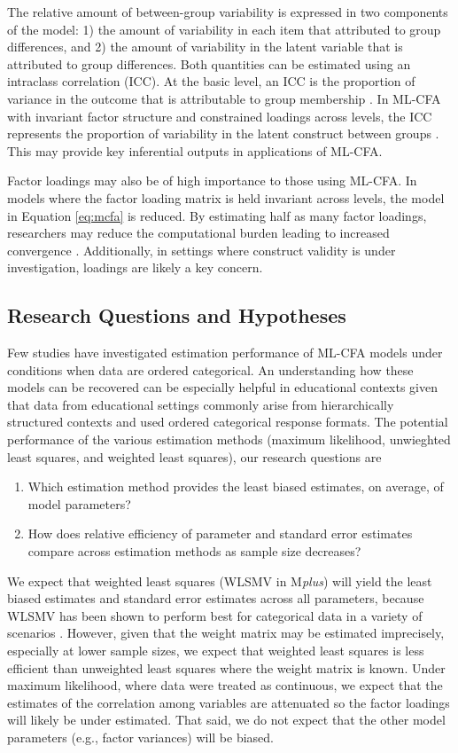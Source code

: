 \documentclass[Review,sageh,times, doublespace]{sagej}
\begin{document}
The relative amount of between-group variability is expressed in two components of the model: 1) the amount of variability in each item that attributed to group differences, and 2) the amount of variability in the latent variable that is attributed to group differences.
Both quantities can be estimated using an intraclass correlation (ICC).
At the basic level, an ICC is the proportion of variance in the outcome that is attributable to group membership \citep[][, pg. 24]{Raudenbush2002}.
In ML-CFA with invariant factor structure and constrained loadings across levels, the ICC represents the proportion of variability in the latent construct between groups \citep[][, pg. 155-171]{Heck2015}.
This may provide key inferential outputs in applications of ML-CFA.

Factor loadings may also be of high importance to those using ML-CFA.
In models where the factor loading matrix is held invariant across levels, the model in Equation \ref{eq:mcfa} is reduced.
By estimating half as many factor loadings, researchers may reduce the computational burden leading to increased convergence \citep{Depaoli2015}.
Additionally, in settings where construct validity is under investigation, loadings are likely a key concern.

\subsection{Research Questions and Hypotheses}

Few studies have investigated estimation performance of ML-CFA models under conditions when data are ordered categorical.
An understanding how these models can be recovered can be especially helpful in educational contexts given that data from educational settings commonly arise from hierarchically structured contexts and used ordered categorical response formats.
The potential performance of the various estimation methods (maximum likelihood, unwieghted least squares, and weighted least squares), our research questions are
\begin{enumerate}
\item Which estimation method provides the least biased estimates, on average, of model parameters?
\item How does relative efficiency of parameter and standard error estimates compare across estimation methods as sample size decreases?
\end{enumerate} 
We expect that weighted least squares (WLSMV in M\textit{plus}) will yield the least biased estimates and standard error estimates across all parameters, because WLSMV has been shown to perform best for categorical data in a variety of scenarios \citep{DiStefano2014, Bandalos2014, Hox2010, Hsu2009, Asparouhov2007}.
However, given that the weight matrix may be estimated imprecisely, especially at lower sample sizes, we expect that weighted least squares is less efficient than unweighted least squares where the weight matrix is known.
Under maximum likelihood, where data were treated as continuous, we expect that the estimates of the correlation among variables are attenuated so the factor loadings will likely be under estimated. 
That said, we do not expect that the other model parameters (e.g., factor variances) will be biased.
\end{document}
